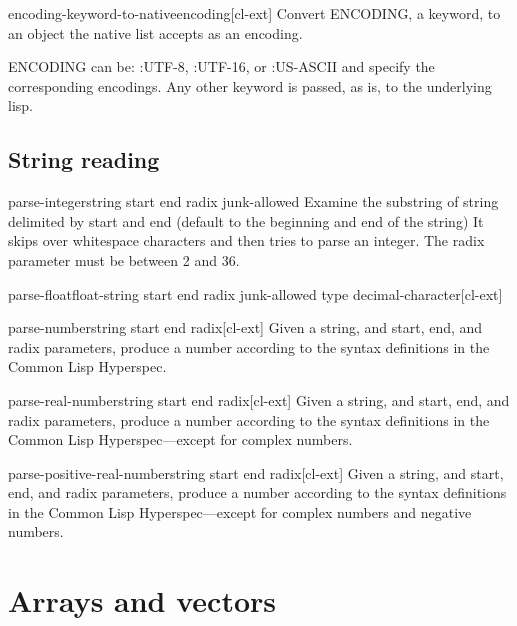 \documentclass[10pt,english]{book}
\begin{document}
\begin{function}{encoding-keyword-to-native}{encoding}[cl-ext]
  Convert ENCODING, a keyword, to an object the native list
accepts as an encoding.

ENCODING can be: :UTF-8, :UTF-16, or :US-ASCII and specify the
corresponding encodings. Any other keyword is passed, as is, to
the underlying lisp.
\end{function}

\section{String reading}
\label{sec:string-reading}

\begin{function}{parse-integer}{string \key start end radix junk-allowed}
  Examine the substring of string delimited by start and end
  (default to the beginning and end of the string)  It skips over
  whitespace characters and then tries to parse an integer. The
  radix parameter must be between 2 and 36.
\end{function}

\begin{function}{parse-float}{float-string \key start end radix junk-allowed type decimal-character}[cl-ext]
\end{function}

\begin{function}{parse-number}{string \key start end radix}[cl-ext]
  Given a string, and start, end, and radix parameters, produce a
  number according to the syntax definitions in the Common Lisp
  Hyperspec.  
\end{function}

\begin{function}{parse-real-number}{string \key start end radix}[cl-ext]
  Given a string, and start, end, and radix parameters, produce a
  number according to the syntax definitions in the Common Lisp
  Hyperspec---except for complex numbers.
\end{function}

\begin{function}{parse-positive-real-number}{string \key start end radix}[cl-ext]
  Given a string, and start, end, and radix parameters, produce a
  number according to the syntax definitions in the Common Lisp
  Hyperspec---except for complex numbers and negative numbers.
\end{function}


\chapter{Arrays and vectors}
\label{cha:arrays}
\end{document}
